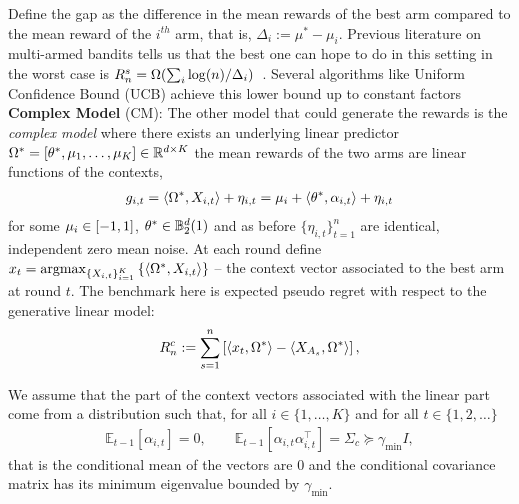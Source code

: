 Define the gap as the difference in the mean rewards of the best arm compared to the mean reward of the $i^{th}$ arm, that is, $\Delta_i := \mu^* - \mu_i $. Previous literature on multi-armed bandits \citep{auer2002finite} tells us that the best one can hope to do in this setting in the worst case is $R^s_{n} = \Omega(\sum_{i}\log(n)/\Delta_i)$~\citep{Lai:1985:AEA:2609660.2609757,bubeck2013bounded}. Several algorithms like Uniform Confidence Bound (UCB) achieve this lower bound up to constant factors \\

\textbf{Complex Model} (CM): The other model that could generate the rewards is the \emph{complex model} where there exists an underlying linear predictor $\Omega^* = [\theta^{*},  \mu_{1},\ldots,\mu_{K} ] \in \mathbb{R}^{d\times K}$ the mean rewards of the two arms are linear functions of the contexts,
\begin{align*}
    g_{i,t} = \langle \Omega^*, X_{i,t} \rangle + \eta_{i,t} = \mu_{i} + \langle \theta^{*}, \alpha_{i,t}\rangle + \eta_{i,t}
\end{align*}
for some $\mu_{i} \in [-1,1]$, $\theta^{*} \in \mathbb{B}_2^d(1)$ and as before $\{\eta_{i,t}\}_{t=1}^n$ are identical, independent zero mean noise. At each round define $x_t = \argmax_{\{\Xit{i}{t}\}_{i=1}^K}\left\{ \langle \Omega^*, X_{i,t}\rangle \right\}$ -- the context vector associated to the best arm at round $t$. The benchmark here is expected pseudo regret with respect to the generative linear model:
\begin{align}
\label{def:expectedregret}
   R^c_{n} :=\sum_{s=1}^n \left[\langle x_t, \Omega^* \rangle - \langle X_{A_s},\Omega^*\rangle \right] ,
\end{align}


We assume that the part of the context vectors associated with the linear part come from a distribution such that, for all $i\in \{1,\ldots,K\}$ and for all $t \in \{1,2,\ldots\}$
\begin{align*}
    \mathbb{E}_{t-1}\left[\alpha_{i,t}\right] = 0, \qquad \mathbb{E}_{t-1}\left[\alpha_{i,t}\alpha_{i,t}^{\top}\right] = \Sigma_c \succeq \gamma_{\min} I,
\end{align*}
that is the conditional mean of the vectors are $0$ and the conditional covariance matrix has its minimum eigenvalue bounded by $\gamma_{\min}$.





